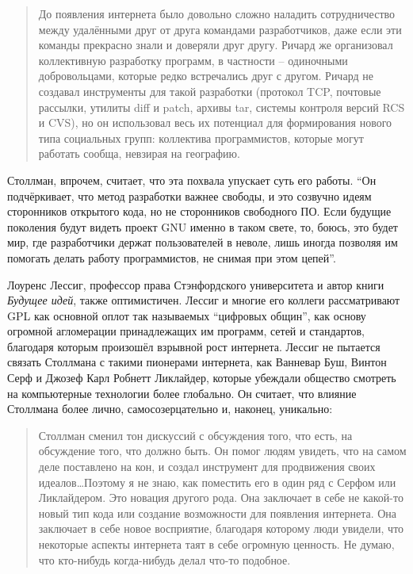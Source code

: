 \begin{quote}
До появления интернета было довольно сложно наладить сотрудничество между удалёнными друг от друга командами разработчиков, даже если эти команды прекрасно знали и доверяли друг другу. Ричард же организовал коллективную разработку программ, в частности -- одиночными добровольцами, которые редко встречались друг с другом. Ричард не создавал инструменты для такой разработки (протокол TCP, почтовые рассылки, утилиты diff и patch, архивы tar, системы контроля версий RCS и CVS), но он использовал весь их потенциал для формирования нового типа социальных групп: коллектива программистов, которые могут работать сообща, невзирая на географию.
\end{quote}

Столлман, впрочем, считает, что эта похвала упускает суть его работы. \enquote{Он подчёркивает, что метод разработки важнее свободы, и это созвучно идеям сторонников открытого кода, но не сторонников свободного ПО. Если будущие поколения будут видеть проект GNU именно в таком свете, то, боюсь, это будет мир, где разработчики держат пользователей в неволе, лишь иногда позволяя им помогать делать работу программистов, не снимая при этом цепей}.

Лоуренс Лессиг, профессор права Стэнфордского университета и автор книги \textit{Будущее идей}, также оптимистичен. Лессиг и многие его коллеги рассматривают GPL как основной оплот так называемых \enquote{цифровых общин}, как основу огромной агломерации принадлежащих им программ, сетей и стандартов, благодаря которым произошёл взрывной рост интернета. Лессиг не пытается связать Столлмана с такими пионерами интернета, как Ванневар Буш, Винтон Серф и Джозеф Карл Робнетт Ликлайдер, которые убеждали общество смотреть на компьютерные технологии более глобально. Он считает, что влияние Столлмана более лично, самосозерцательно и, наконец, уникально:

\begin{quote}
Столлман сменил тон дискуссий с обсуждения того, что есть, на обсуждение того, что должно быть. Он помог людям увидеть, что на самом деле поставлено на кон, и создал инструмент для продвижения своих идеалов\ldots Поэтому я не знаю, как поместить его в один ряд с Серфом или Ликлайдером. Это новация другого рода. Она заключает в себе не какой-то новый тип кода или создание возможности для появления интернета. Она заключает в себе новое восприятие, благодаря которому люди увидели, что некоторые аспекты интернета таят в себе огромную ценность. Не думаю, что кто-нибудь когда-нибудь делал что-то подобное.
\end{quote}


